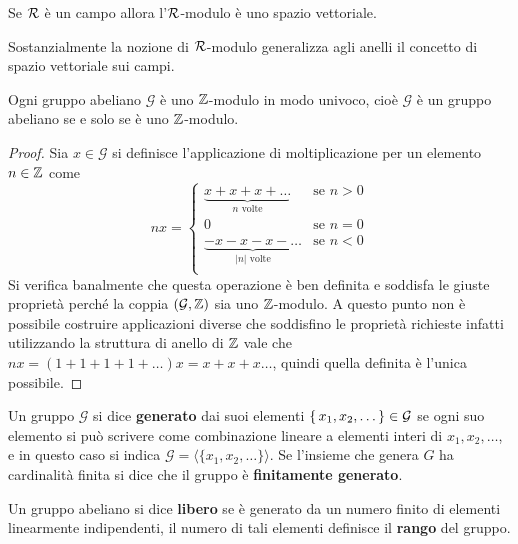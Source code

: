 \begin{osservation}
  Se $ \mathcal{R} $ è un campo allora l'$ \mathcal{R} $-modulo è uno spazio vettoriale.
\end{osservation}
Sostanzialmente la nozione di $ \mathcal{R} $-modulo generalizza agli anelli il concetto di spazio vettoriale sui campi.

\begin{osservation}
  Ogni gruppo abeliano $ \mathcal{G} $ è uno $ \mathbb{Z} $-modulo in modo univoco, cioè $ \mathcal{G} $ è un
  gruppo abeliano se e solo se è uno $ \mathbb{Z} $-modulo.
\end{osservation}
\begin{proof}
  Sia $ x \in \mathcal{G} $ si definisce l'applicazione di moltiplicazione per un elemento $ n \in \mathbb{Z} $ come
  \[
    nx =
    \begin{cases}
      \underbrace{ x + x + x + \dots}_{n \text{ volte}} & \text{se } n > 0 \\
      0 & \text{se } n = 0 \\
      \underbrace{ - x - x - x - \dots}_{|n| \text{ volte}} & \text{se } n < 0 \\
    \end{cases}
  \]
  Si verifica banalmente che questa operazione è ben definita e soddisfa
  le giuste proprietà perché la coppia $ (\mathcal{G}, \mathbb{Z}) $ sia uno $ \mathbb{Z} $-modulo.
  A questo punto non è possibile costruire applicazioni diverse che soddisfino le
  proprietà richieste infatti utilizzando la struttura di anello di $ \mathbb{Z} $ vale che
  $ n x = (1 + 1 + 1 + 1 + \dots) x = x + x + x \dots $, quindi quella definita
  è l'unica possibile.
\end{proof}

\begin{definition}
  Un gruppo $ \mathcal{G} $ si dice \textbf{generato} dai
  suoi elementi $ \set{x_1, x_2, \dots} \in \mathcal{G} $ se ogni suo elemento
  si può scrivere come combinazione lineare a elementi interi di
  $ x_1, x_2, \dots $, e in questo caso si indica
  $ \mathcal{G} = \langle \{ x_1, x_2, \dots \} \rangle $. Se l'insieme che
  genera $ G $ ha cardinalità finita si dice che il gruppo è \textbf{finitamente
    generato}.
\end{definition}

\begin{definition}
  Un gruppo abeliano si dice \textbf{libero} se è generato
  da un numero finito di elementi linearmente indipendenti, il numero di tali elementi
  definisce il \textbf{rango} del gruppo.
\end{definition}

